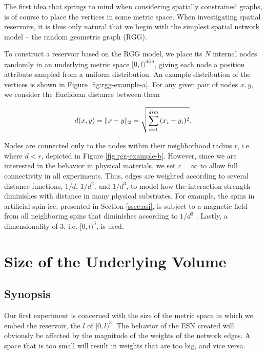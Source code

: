 The first idea that springs to mind when considering spatially constrained
graphs, is of course to place the vertices in some metric space. When
investigating spatial reservoirs, it is thus only natural that we begin with the
simplest spatial network model -- the random geometric graph (RGG).

To construct a reservoir based on the RGG model, we place its $N$ internal nodes
randomly in an underlying metric space $[0, l)^{dim}$, giving each node a
position attribute sampled from a uniform distribution. An example distribution
of the vertices is shown in Figure \ref{fig:rgg-example-a}. For any given pair
of nodes $x, y$, we consider the Euclidean distance between them

\begin{equation}
  d(x, y) = \Vert x-y \Vert_{2} = \sqrt{\sum_{i=1}^{dim}{(x_{i}-y_{i})^2}}.
  \label{eq:rgg-dist}
\end{equation}

Nodes are connected only to the nodes within their neighborhood radius $r$,
i.e. where $d < r$, depicted in Figure \ref{fig:rgg-example-b}. However, since
we are interested in the behavior in physical materials, we set $r = \infty$ to
allow full connectivity in all experiments. Thus, edges are weighted according
to several distance functions, $1/d$, $1/d^2$, and $1/d^3$, to model how the
interaction strength diminishes with distance in many physical substrates. For
example, the spins in artificial spin ice, presented in Section \ref{ssec:asi},
is subject to a magnetic field from all neighboring spins that diminishes
according to $1/d^3$ \cite{jensen_computation_2018}. Lastly, a dimensionality of
3, i.e. $[0, l)^{3}$, is used.

\section{Size of the Underlying Volume}
\label{sec:volume-size}

\subsection{Synopsis}

Our first experiment is concerned with the size of the metric space in which we
embed the reservoir, the $l$ of $[0, l)^3$. The behavior of the ESN created will
obviously be affected by the magnitude of the weights of the network edges. A
space that is too small will result in weights that are too big, and vice versa.

